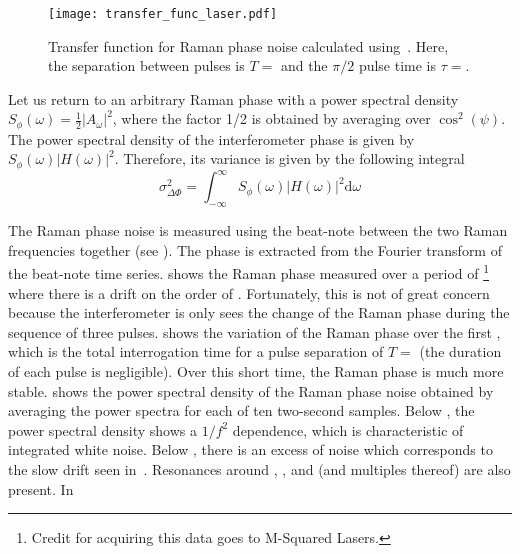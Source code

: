\begin{figure}[htpb!]
  \centering
  \texttt{[image: transfer\_func\_laser.pdf]}
  \caption[Transfer function for Raman phase noise.]{Transfer function
    for Raman phase noise calculated
    using~. Here, the separation between pulses is \(T =
  \) and the \(\pi/2\) pulse time is \(\tau
=\).}
  \label{fig:transfer_function}
\end{figure}
\par\noindent
Let us return to an arbitrary Raman phase with a power spectral density
$S_\phi(\omega) = \frac{1}{2}|A_\omega|^2$, where the factor 1/2 is
obtained by averaging over $\cos^2(\psi)$. The power spectral density of the interferometer
phase is given by $S_\phi(\omega) |H(\omega)|^2$. Therefore, its
variance is given by the following integral
\begin{equation}
  \sigma_{\Delta\Phi}^2 = \int_{-\infty}^\infty
    S_\phi(\omega)|H(\omega)|^2 \mathrm{d}\omega 
  \end{equation}
 \par\noindent
The Raman phase noise is measured using the beat-note between the two Raman frequencies together (see
). The phase is extracted from the
Fourier transform of the beat-note time series. 
shows the Raman phase measured over a period of
\footnote{Credit for
acquiring this data goes to M-Squared Lasers.} where there is a drift
on the order of . 
Fortunately, this is not of great concern because the interferometer
is only sees the change of the Raman phase during the sequence of
three pulses.  shows the
variation of the Raman phase over the first , which
is the total interrogation time for a pulse separation of $T = $
 (the duration of each pulse is
negligible). Over this short time, the Raman phase
is much more stable.  shows the power
spectral density of the Raman phase noise obtained by averaging the
power spectra for each of ten two-second samples. Below , the
power spectral density shows a $1/f^2$ dependence, which is
characteristic of integrated white noise. Below ,
there is an excess of noise which corresponds to the slow drift seen
in~. Resonances around
, ,  and
 (and multiples thereof) are also present. In
